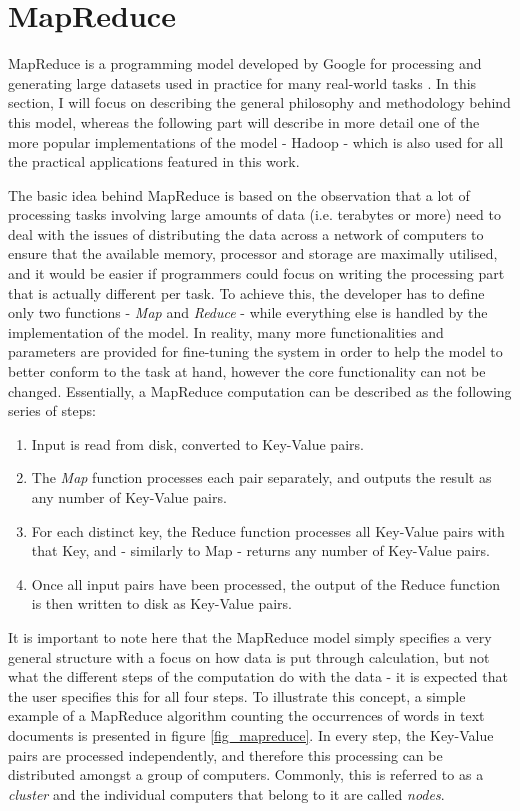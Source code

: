 \documentclass [12pt,a4paper]{report}
\begin{document}
\section{MapReduce}

MapReduce is a programming model developed by Google for processing and generating large datasets used in practice for many real-world tasks \cite{Dean:2008:MSD:1327452.1327492}. In this section, I will focus on describing the general philosophy and methodology behind this model, whereas the following part will describe in more detail one of the more popular implementations of the model - Hadoop - which is also used for all the practical applications featured in this work.

The basic idea behind MapReduce is based on the observation that a lot of processing tasks involving large amounts of data (i.e. terabytes or more) need to deal with the issues of distributing the data across a network of computers to ensure that the available memory, processor and storage are maximally utilised, and it would be easier if programmers could focus on writing the processing part that is actually different per task. To achieve this, the developer has to define only two functions - \textit{Map} and \textit{Reduce} - while everything else is handled by the implementation of the model. In reality, many more functionalities and parameters are provided for fine-tuning the system in order to help the model to better conform to the task at hand, however the core functionality can not be changed. Essentially, a MapReduce computation can be described as the following series of steps:

\begin{enumerate}
\item Input is read from disk, converted to Key-Value pairs.
\item The \textit{Map} function processes each pair separately, and outputs the result as any number of Key-Value pairs.
\item For each distinct key, the Reduce function processes all Key-Value pairs with that Key, and - similarly to Map - returns any number of Key-Value pairs.
\item Once all input pairs have been processed, the output of the Reduce function is then written to disk as Key-Value pairs. 
\end{enumerate}

It is important to note here that the MapReduce model simply specifies a very general structure with a focus on how data is put through calculation, but not what the different steps of the computation do with the data - it is expected that the user specifies this for all four steps. To illustrate this concept, a simple example of a MapReduce algorithm counting the occurrences of words in text documents is presented in figure \ref{fig_mapreduce}. In every step, the Key-Value pairs are processed independently, and therefore this processing can be distributed amongst a group of computers. Commonly, this is referred to as a \textit{cluster} and the individual computers that belong to it are called \textit{nodes}.
\end{document}
